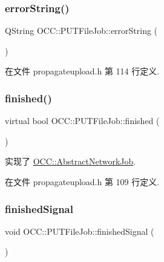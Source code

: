 \subsubsection{\texorpdfstring{error\+String()}{errorString()}}
{\footnotesize\ttfamily Q\+String O\+C\+C\+::\+P\+U\+T\+File\+Job\+::error\+String (\begin{DoxyParamCaption}{ }\end{DoxyParamCaption})}



在文件 propagateupload.\+h 第 114 行定义.

\mbox{\label{class_o_c_c_1_1_p_u_t_file_job_aeca049817cfb255d038f4bc7faf0a204}} 
\subsubsection{\texorpdfstring{finished()}{finished()}}
{\footnotesize\ttfamily virtual bool O\+C\+C\+::\+P\+U\+T\+File\+Job\+::finished (\begin{DoxyParamCaption}{ }\end{DoxyParamCaption})\hspace{0.3cm}{\ttfamily [virtual]}}



实现了 \hyperlink{class_o_c_c_1_1_abstract_network_job_af811f7299d7e526678a8758f2e7102d2}{O\+C\+C\+::\+Abstract\+Network\+Job}.



在文件 propagateupload.\+h 第 109 行定义.

\mbox{\label{class_o_c_c_1_1_p_u_t_file_job_a71169802aa933c6f49b7d6695136f330}} 
\subsubsection{\texorpdfstring{finished\+Signal}{finishedSignal}}
{\footnotesize\ttfamily void O\+C\+C\+::\+P\+U\+T\+File\+Job\+::finished\+Signal (\begin{DoxyParamCaption}{ }\end{DoxyParamCaption})\hspace{0.3cm}{\ttfamily [signal]}}

